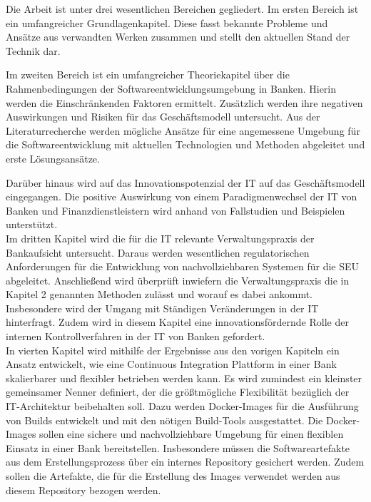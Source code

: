 Die Arbeit ist unter drei wesentlichen Bereichen gegliedert. 
Im ersten Bereich ist ein umfangreicher Grundlagenkapitel. Diese fasst bekannte Probleme und Ansätze aus verwandten Werken zusammen und stellt den aktuellen Stand der Technik dar. 

Im zweiten Bereich ist ein umfangreicher Theoriekapitel über die Rahmenbedingungen der Softwareentwicklungsumgebung in Banken. Hierin werden die Einschränkenden Faktoren ermittelt. Zusätzlich werden ihre negativen Auswirkungen und Risiken für das Geschäftsmodell untersucht. Aus der Literaturrecherche werden mögliche Ansätze für eine angemessene Umgebung für die Softwareentwicklung mit aktuellen Technologien und Methoden abgeleitet und erste Lösungsansätze. 

Darüber hinaus wird auf das Innovationspotenzial der IT auf das Geschäftsmodell eingegangen. Die positive Auswirkung von einem Paradigmenwechsel der IT von Banken und Finanzdienstleistern wird anhand von Fallstudien und Beispielen unterstützt.
\medskip
\\
Im dritten Kapitel wird die für die IT relevante Verwaltungspraxis der Bankaufsicht untersucht. Daraus werden wesentlichen regulatorischen Anforderungen für die Entwicklung von nachvollziehbaren Systemen für die \ac{SEU} abgeleitet. Anschließend wird überprüft inwiefern die Verwaltungspraxis die in Kapitel 2 genannten Methoden zulässt und worauf es dabei ankommt. Insbesondere wird der Umgang mit Ständigen Veränderungen in der IT hinterfragt. Zudem wird in diesem Kapitel eine innovationsfördernde Rolle der internen Kontrollverfahren in der IT von Banken gefordert.
\medskip
\\
In vierten Kapitel wird mithilfe der Ergebnisse aus den vorigen Kapiteln ein Ansatz entwickelt, wie eine Continuous Integration Plattform in einer Bank skalierbarer und flexibler betrieben werden kann. Es wird zumindest ein kleinster gemeinsamer Nenner definiert, der die größtmögliche Flexibilität bezüglich der IT-Architektur beibehalten soll. Dazu werden Docker-Images für die Ausführung von Builds entwickelt und mit den nötigen Build-Tools ausgestattet. Die Docker-Images sollen eine sichere und nachvollziehbare Umgebung für einen flexiblen Einsatz in einer Bank bereitstellen. Insbesondere müssen die Softwareartefakte aus dem Erstellungsprozess über ein internes Repository gesichert werden. Zudem sollen die Artefakte, die für die Erstellung des Images verwendet werden aus diesem Repository bezogen werden. 